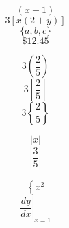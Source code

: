 \documentclass[11pt]{article}
\begin{document}
$$(x+1)$$
$$3[x(2+y)]$$
$$\{a,b,c\}$$
$$\$12.45$$

$$3\left(\frac{2}{5}\right)$$
$$3\left[\frac{2}{5}\right]$$
$$3\left\{\frac{2}{5}\right\}$$

$$|x|$$
$$\left|\frac{3}{5}\right|$$

$$\left\{x^2\right.$$
$$\left.\frac{dy}{dx}\right|_{x=1}$$
\end{document}
